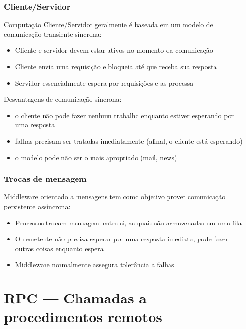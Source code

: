 \documentclass[Ligatures=TeX,table,brazil,svgnames,usetotalslideindicator,compress,10pt]{beamer}
\begin{document}
\begin{frame}
  \frametitle{Cliente/Servidor}

  Computação Cliente/Servidor geralmente é baseada em um modelo de \alert{comunicação transiente síncrona}:
  \begin{itemize}
  \item Cliente e servidor devem estar ativos no momento da comunicação
  \item Cliente envia uma requisição e bloqueia até que receba sua resposta
  \item Servidor essencialmente espera por requisições e as processa
  \end{itemize}

  \pause
  \begin{block}{Desvantagens de comunicação síncrona:}
    \begin{itemize}
    \item o cliente não pode fazer nenhum trabalho enquanto estiver esperando por uma resposta
    \item falhas precisam ser tratadas imediatamente (afinal, o cliente está esperando)
    \item o modelo pode não ser o mais apropriado (mail, news)
    \end{itemize}
  \end{block}

\end{frame}

\begin{frame}
  \frametitle{Trocas de mensagem}
  \begin{block}{Middleware orientado a mensagens}
    tem como objetivo prover \alert{comunicação persistente assíncrona}:
    \begin{itemize}
    \item Processos trocam mensagens entre si, as quais são armazenadas em uma fila
    \item O remetente não precisa esperar por uma resposta imediata, pode fazer outras coisas enquanto espera
    \item Middleware normalmente assegura tolerância a falhas
    \end{itemize}
  \end{block}
\end{frame}


\section{RPC --- Chamadas a procedimentos remotos}
\end{document}
